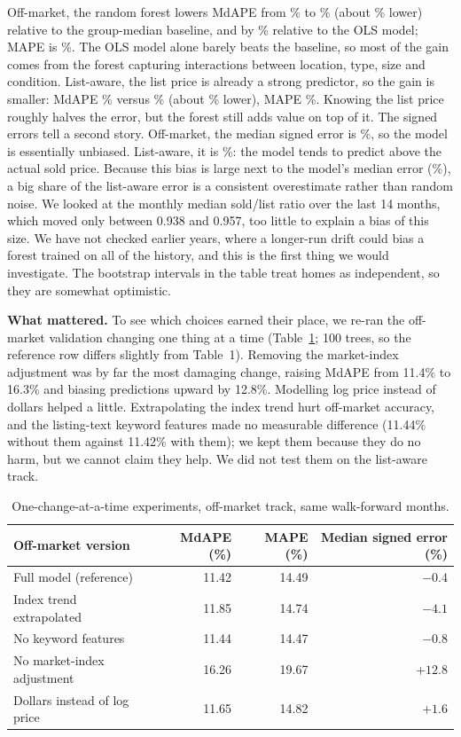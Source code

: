 \documentclass[11pt]{article}
\begin{document}
Off-market, the random forest lowers MdAPE from \offBaseMdAPE\% to \offMdAPE\% (about \offGainBase\% lower) relative to the group-median baseline, and by \offGainOls\% relative to the OLS model; MAPE is \offMAPE\%. The OLS model alone barely beats the baseline, so most of the gain comes from the forest capturing interactions between location, type, size and condition. List-aware, the list price is already a strong predictor, so the gain is smaller: MdAPE \laMdAPE\% versus \laBaseMdAPE\% (about \laGainBase\% lower), MAPE \laMAPE\%. Knowing the list price roughly halves the error, but the forest still adds value on top of it. The signed errors tell a second story. Off-market, the median signed error is \offBiasPct\%, so the model is essentially unbiased. List-aware, it is \laBiasPct\%: the model tends to predict above the actual sold price. Because this bias is large next to the model's median error (\laMdAPE\%), a big share of the list-aware error is a consistent overestimate rather than random noise. We looked at the monthly median sold/list ratio over the last 14 months, which moved only between 0.938 and 0.957, too little to explain a bias of this size. We have not checked earlier years, where a longer-run drift could bias a forest trained on all of the history, and this is the first thing we would investigate. The bootstrap intervals in the table treat homes as independent, so they are somewhat optimistic.

\textbf{What mattered.} To see which choices earned their place, we re-ran the off-market validation changing one thing at a time (Table~\ref{tab:abl}; 100 trees, so the reference row differs slightly from Table~1). Removing the market-index adjustment was by far the most damaging change, raising MdAPE from 11.4\% to 16.3\% and biasing predictions upward by 12.8\%. Modelling log price instead of dollars helped a little. Extrapolating the index trend hurt off-market accuracy, and the listing-text keyword features made no measurable difference (11.44\% without them against 11.42\% with them); we kept them because they do no harm, but we cannot claim they help. We did not test them on the list-aware track.

\begin{table}[h]
\centering
\begin{tabular}{lrrr}
\toprule
Off-market version & MdAPE (\%) & MAPE (\%) & Median signed error (\%) \\
\midrule
Full model (reference) & 11.42 & 14.49 & $-0.4$ \\
Index trend extrapolated & 11.85 & 14.74 & $-4.1$ \\
No keyword features & 11.44 & 14.47 & $-0.8$ \\
No market-index adjustment & 16.26 & 19.67 & $+12.8$ \\
Dollars instead of log price & 11.65 & 14.82 & $+1.6$ \\
\bottomrule
\end{tabular}
\caption{One-change-at-a-time experiments, off-market track, same walk-forward months.}
\label{tab:abl}
\end{table}
\end{document}
